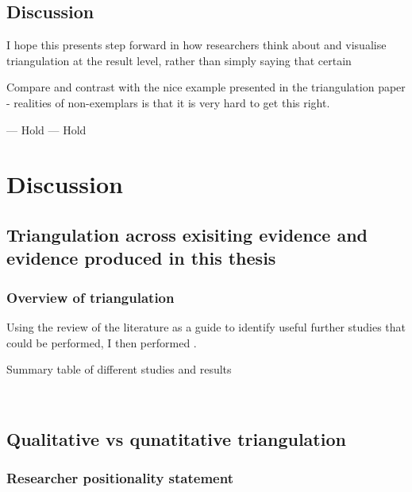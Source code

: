 \documentclass[a4paper, twoside]{templates/ociamthesis}
\begin{document}
\hypertarget{discussion-4}{%
\section{Discussion}\label{discussion-4}}

I hope this presents step forward in how researchers think about and visualise triangulation at the result level, rather than simply saying that certain

Compare and contrast with the nice example presented in the triangulation paper - realities of non-exemplars is that it is very hard to get this right.

--- Hold --- Hold

\hypertarget{discussion-heading}{%
\chapter{Discussion}\label{discussion-heading}}

\minitoc 

\hypertarget{triangulation-across-exisiting-evidence-and-evidence-produced-in-this-thesis}{%
\section{Triangulation across exisiting evidence and evidence produced in this thesis}\label{triangulation-across-exisiting-evidence-and-evidence-produced-in-this-thesis}}

\hypertarget{triangulation-overview}{%
\subsection{Overview of triangulation}\label{triangulation-overview}}

Using the review of the literature as a guide to identify useful further studies that could be performed, I then performed .

Summary table of different studies and results

~

\hypertarget{qualitative-vs-qunatitative-triangulation}{%
\section{Qualitative vs qunatitative triangulation}\label{qualitative-vs-qunatitative-triangulation}}

\hypertarget{researcher-positionality-statement}{%
\subsection{Researcher positionality statement}\label{researcher-positionality-statement}}
\end{document}
